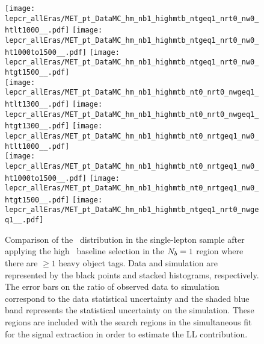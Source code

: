 \begin{figure}[!h]
	\begin{center}
  \texttt{[image: lepcr\_allEras/MET\_pt\_DataMC\_hm\_nb1\_highmtb\_ntgeq1\_nrt0\_nw0\_htlt1000\_\_.pdf]}
  \texttt{[image: lepcr\_allEras/MET\_pt\_DataMC\_hm\_nb1\_highmtb\_ntgeq1\_nrt0\_nw0\_ht1000to1500\_\_.pdf]}
  \texttt{[image: lepcr\_allEras/MET\_pt\_DataMC\_hm\_nb1\_highmtb\_ntgeq1\_nrt0\_nw0\_htgt1500\_\_.pdf]} \\
  \texttt{[image: lepcr\_allEras/MET\_pt\_DataMC\_hm\_nb1\_highmtb\_nt0\_nrt0\_nwgeq1\_htlt1300\_\_.pdf]} 
  \texttt{[image: lepcr\_allEras/MET\_pt\_DataMC\_hm\_nb1\_highmtb\_nt0\_nrt0\_nwgeq1\_htgt1300\_\_.pdf]} 
  \texttt{[image: lepcr\_allEras/MET\_pt\_DataMC\_hm\_nb1\_highmtb\_nt0\_nrtgeq1\_nw0\_htlt1000\_\_.pdf]} \\
  \texttt{[image: lepcr\_allEras/MET\_pt\_DataMC\_hm\_nb1\_highmtb\_nt0\_nrtgeq1\_nw0\_ht1000to1500\_\_.pdf]} 
  \texttt{[image: lepcr\_allEras/MET\_pt\_DataMC\_hm\_nb1\_highmtb\_nt0\_nrtgeq1\_nw0\_htgt1500\_\_.pdf]} 
  \texttt{[image: lepcr\_allEras/MET\_pt\_DataMC\_hm\_nb1\_highmtb\_ntgeq1\_nrt0\_nwgeq1\_\_.pdf]} \\
	\end{center}
	\caption[Lost Lepton HM Control Region $\nb=1$]{Comparison of the \met~distribution in the single-lepton sample after applying the high \dm~baseline selection in the $\nb=1$ region where there are $\geq1$ heavy object tags. Data and simulation are represented by the black points and stacked histograms, respectively. The error bars on the ratio of observed data to simulation correspond to the data statistical uncertainty and the shaded blue band represents the statistical uncertainty on the simulation. These regions are included with the search regions in the simultaneous fit for the signal extraction in order to estimate the LL contribution.
	 }
	\label{fig:llb-1lcr-datavsmc-hm-nb1}
\end{figure}

